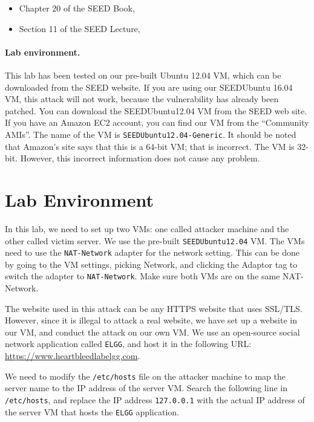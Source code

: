 \begin{itemize}
\item Chapter 20 of the SEED Book, \seedbook
\item Section 11 of the SEED Lecture, \seedisvideo
\end{itemize}



\paragraph{Lab environment.} This lab has been tested on our pre-built
Ubuntu 12.04 VM, which can be downloaded from the SEED website.
If you are using our SEEDUbuntu 16.04 VM, this attack will not work, because the
vulnerability has already been patched.
You can download the SEEDUbuntu12.04 VM from the SEED web
site. If you have an Amazon EC2 account, you can find our VM from
the ``Community AMIs''. The name of the VM is
\texttt{SEEDUbuntu12.04-Generic}. It should be noted that
Amazon's site says that this is a 64-bit VM; that is incorrect. The VM is
32-bit. However, this incorrect information does not cause any problem.






\section{Lab Environment}

In this lab, we need to set up two VMs: one called attacker machine 
and the other called victim server.  We use the 
pre-built \texttt{SEEDUbuntu12.04} VM. The VMs need to use the 
\texttt{NAT-Network} adapter
for the network setting. This can be done by going to the VM settings,
picking Network, and clicking the Adaptor tag to switch the adapter to
\texttt{NAT-Network}. Make sure both VMs are on the same NAT-Network.

The website used in this attack can be any HTTPS website that uses SSL/TLS.
However, since it is illegal to attack a real website, we 
have set up a website in our VM, and conduct the attack on our own VM.
We use an open-source social network application called \texttt{ELGG},
and host it in the following URL: \url{https://www.heartbleedlabelgg.com}.

We need to modify the \texttt{/etc/hosts} file on the attacker
machine to map the server name to the IP address of 
the server VM. Search the following line in \texttt{/etc/hosts}, and 
replace the IP address \texttt{127.0.0.1} with the actual IP address of the
server VM that hosts the \texttt{ELGG} application.


